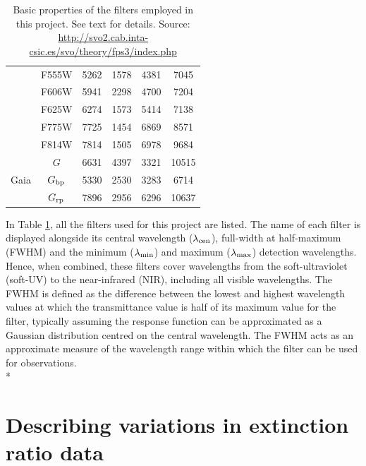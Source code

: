 \documentclass[12pt, a4paper]{report}
\begin{document}
\begin{table}
\begin{center}
\begin{tabular}{cccccc}
& F555W & 5262 & 1578 & 4381 & 7045 \\ %
& F606W & 5941 & 2298 & 4700 & 7204 \\ %
& F625W & 6274 & 1573 & 5414 & 7138 \\ %
& F775W & 7725 & 1454 & 6869 & 8571 \\ %
& F814W & 7814 & 1505 & 6978 & 9684 \\ %
\hline
& $G$ & 6631 & 4397 & 3321 & 10515 \\ %
Gaia & $G_{\textnormal{bp}}$ & 5330 & 2530 & 3283 & 6714 \\ %
& $G_{\textnormal{rp}}$ & 7896 & 2956 & 6296 & 10637 \\ %
\hline

\end{tabular}
\caption{Basic properties of the filters employed in this project. See text for details. Source: \protect\url{http://svo2.cab.inta-csic.es/svo/theory/fps3/index.php}}
\label{filter_basics}
\end{center}
\end{table}

In Table \ref{filter_basics}, all the filters used for this project are listed. The name of each filter is displayed alongside its central wavelength ($\lambda_{\textnormal{cen}}$), full-width at half-maximum (FWHM) and the minimum ($\lambda_{\textnormal{min}}$) and maximum ($\lambda_{\textnormal{max}}$) detection wavelengths. Hence, when combined, these filters cover wavelengths from the soft-ultraviolet (soft-UV) to the near-infrared (NIR), including all visible wavelengths. The FWHM is defined as the difference between the lowest and highest wavelength values at which the transmittance value is half of its maximum value for the filter, typically assuming the response function can be approximated as a Gaussian distribution centred on the central wavelength. The FWHM acts as an approximate measure of the wavelength range within which the filter can be used for observations.\\*

\section{Describing variations in extinction ratio data} \label{desc_var}
\end{document}
